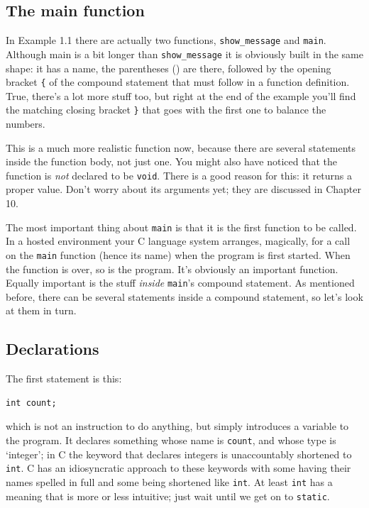   

  \subsection{The main function}
   

   In Example 1.1 there are actually two functions,
    \texttt{show\_message} and \texttt{main}. Although main is a bit
    longer than \texttt{show\_message} it is obviously built in the same
    shape: it has a name, the parentheses () are there, followed by the opening
    bracket \texttt{\{} of the compound statement that must follow in a
    function definition. True, there's a lot more stuff too, but right at the
    end of the example you'll find the matching closing bracket \texttt{\}}
    that goes with the first one to balance the numbers.


   This is a much more realistic function now, because there are several
    statements inside the function body, not just one. You might also have
    noticed that the function is \textit{not} declared to be
    \texttt{void}. There is a good reason for this: it returns a proper
    value. Don't worry about its arguments yet; they are discussed in
    Chapter 10.


   The most important thing about \texttt{main} is that it is the first
    function to be called. In a hosted environment your C language system
    arranges, magically, for a call on the \texttt{main} function (hence
    its name) when the program is first started. When the function is over, so
    is the program. It's obviously an important function. Equally important is
    the stuff \textit{inside} \texttt{main}'s compound statement. As
    mentioned before, there can be several statements inside a compound
    statement, so let's look at them in turn.


  

  \subsection{Declarations}
   

   The first statement is this:


   \begin{Verbatim}
int count;
\end{Verbatim}

   which is not an instruction to do anything, but simply introduces a
    variable to the program. It declares something whose name is
    \texttt{count}, and whose type is `integer'; in C the
    keyword that declares integers is unaccountably shortened to
    \texttt{int}. C has an idiosyncratic approach to these keywords with
    some having their names spelled in full and some being shortened like
    \texttt{int}. At least \texttt{int} has a meaning that is more or
    less intuitive; just wait until we get on to \texttt{static}.


